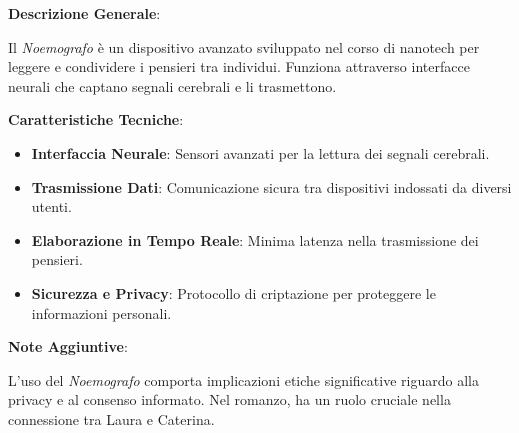\vspace{0.5cm}

\begin{tcolorbox}[colback=white,colframe=black,title=\textbf{Noemografo}]
\begin{multicols}{2}
\textbf{Descrizione Generale}:

Il \emph{Noemografo} è un dispositivo avanzato sviluppato nel corso di nanotech per leggere e condividere i pensieri tra individui. Funziona attraverso interfacce neurali che captano segnali cerebrali e li trasmettono.

\textbf{Caratteristiche Tecniche}:
\begin{itemize}
    \item \textbf{Interfaccia Neurale}: Sensori avanzati per la lettura dei segnali cerebrali.
    \item \textbf{Trasmissione Dati}: Comunicazione sicura tra dispositivi indossati da diversi utenti.
    \item \textbf{Elaborazione in Tempo Reale}: Minima latenza nella trasmissione dei pensieri.
    \item \textbf{Sicurezza e Privacy}: Protocollo di criptazione per proteggere le informazioni personali.
\end{itemize}

\textbf{Note Aggiuntive}:

L'uso del \emph{Noemografo} comporta implicazioni etiche significative riguardo alla privacy e al consenso informato. Nel romanzo, ha un ruolo cruciale nella connessione tra Laura e Caterina.

\end{multicols}
\end{tcolorbox}

\vspace{0.5cm}

